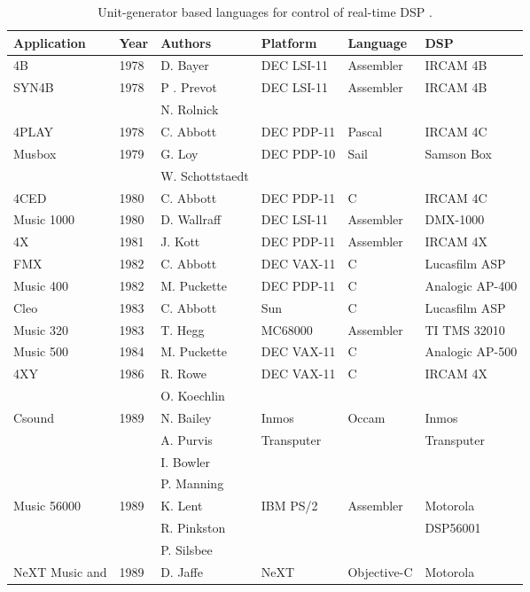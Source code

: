 \begin{table}[htbp]
	\caption{Unit­-generator ­based languages for control of real-­time DSP \cite[807-808]{Roads1995}.}
	\centering
	\vspace{12pt}
	\begin{tabular}{ *{6}{l} }
		\hline
		Application & Year & Authors & Platform & Language & DSP \\
		\hline
		4B & 1978 & D. Bayer & DEC LSI­-11 & Assembler & IRCAM 4B \\
		SYN4B & 1978 & P . Prevot & DEC LSI­-11 & Assembler & IRCAM 4B \\
		& & N. Rolnick & & & \\
		4PLAY & 1978 & C. Abbott & DEC PDP­-11 & Pascal & IRCAM 4C \\
		Musbox & 1979 & G. Loy & DEC PDP­-10 & Sail & Samson Box \\
		& & W. Schottstaedt & & & \\
		4CED & 1980 & C. Abbott & DEC PDP­-11 & C & IRCAM 4C \\
		Music 1000 & 1980 & D. Wallraff & DEC LSI­-11 & Assembler & DMX­-1000 \\
		4X & 1981 & J. Kott & DEC PDP­-11 & Assembler & IRCAM 4X \\
		FMX & 1982 & C. Abbott & DEC VAX-11 & C & Lucasfilm ASP \\
		Music 400 & 1982 & M. Puckette & DEC PDP-11 & C & Analogic AP­-400 \\
		Cleo & 1983 & C. Abbott & Sun & C & Lucasfilm ASP \\
		Music 320 & 1983 & T. Hegg & MC68000 & Assembler & TI TMS 32010 \\
		Music 500 & 1984 & M. Puckette & DEC VAX­-11 & C & Analogic AP­-500 \\
		4XY & 1986 & R. Rowe & DEC VAX-11 & C & IRCAM 4X \\
		& & O. Koechlin & & & \\
		Csound & 1989 & N. Bailey & Inmos & Occam & Inmos \\
		& & A. Purvis & Transputer & & Transputer \\
		& & I. Bowler & & & \\
		& & P. Manning & & & \\
		Music 56000 & 1989 & K. Lent & IBM PS/2 & Assembler & Motorola \\
		& & R. Pinkston & & & DSP56001 \\
		& & P. Silsbee & & & \\
		NeXT Music and & 1989 & D. Jaffe & NeXT & Objective-C & Motorola \\

\end{tabular}
\end{table}
